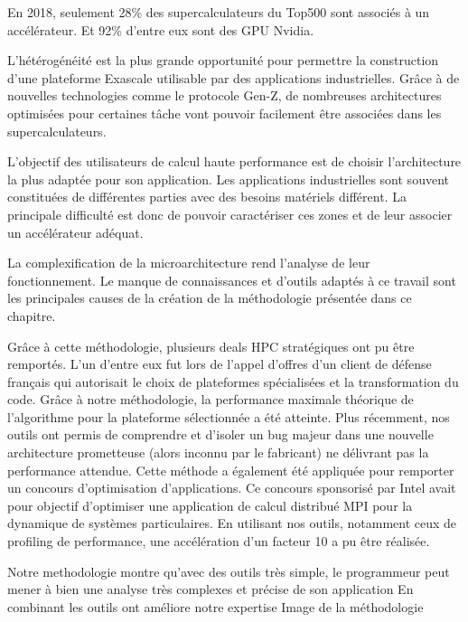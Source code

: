   En 2018, seulement 28\% des supercalculateurs du Top500 sont associés à un accélérateur. Et 92\% d'entre eux sont des GPU Nvidia.
    
    L'hétérogénéité est la plus grande opportunité pour permettre la construction d'une plateforme Exascale utilisable par des applications industrielles.
    Grâce à de nouvelles technologies comme le protocole Gen-Z, de nombreuses architectures optimisées pour certaines tâche vont pouvoir facilement être associées dans les supercalculateurs. 
    
    L'objectif des utilisateurs de calcul haute performance est de choisir l'architecture la plus adaptée pour son application. Les applications industrielles sont souvent constituées de différentes parties avec des besoins matériels différent. La principale difficulté est donc de pouvoir caractériser ces zones et de leur associer un accélérateur adéquat.
    
    
    
    La complexification de la microarchitecture rend l'analyse de leur  fonctionnement. Le manque de connaissances et d'outils adaptés à ce travail sont les principales causes de la création de la méthodologie présentée dans ce chapitre.
    
    
    Grâce à cette méthodologie, plusieurs deals HPC stratégiques ont pu être remportés. L’un d’entre eux fut lors de l’appel d’offres d’un client de défense français qui autorisait le choix de plateformes spécialisées et la transformation du code. Grâce à notre méthodologie, la performance maximale théorique de l’algorithme pour la plateforme sélectionnée a été atteinte. Plus récemment, nos outils ont permis de comprendre et d’isoler un bug majeur dans une nouvelle architecture prometteuse (alors inconnu par le fabricant) ne délivrant pas la performance attendue. Cette méthode a également été appliquée pour remporter un concours d’optimisation d’applications. Ce concours sponsorisé par Intel avait pour objectif d’optimiser une application de calcul distribué MPI pour la dynamique de systèmes particulaires. En utilisant nos outils, notamment ceux de profiling de performance, une accélération d’un facteur 10 a pu être réalisée.
    
    
    Notre methodologie montre qu'avec des outils très simple, le programmeur peut mener à bien une analyse très complexes et précise de son application
    En combinant les outils ont améliore notre expertise
    Image de la méthodologie
    
    